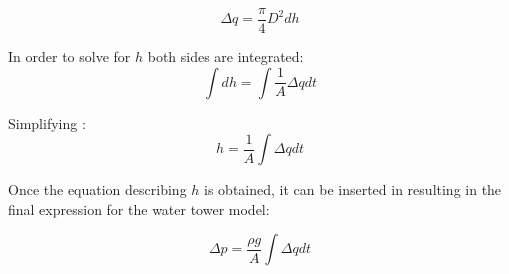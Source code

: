 \begin{equation}
  \Delta q =  \frac{\pi}{4} D^2 {dh}
\end{equation}

In order to solve for $h$ both sides are integrated: 
\begin{equation}
  \int dh = \int \frac{1}{A} \Delta q dt
  \label{integheight}
\end{equation}

Simplifying :
\begin{equation}
  h =\frac{1}{A}  \int  \Delta q dt
\end{equation}

Once the equation describing $h$ is obtained, it can be inserted in  
resulting in the final expression for the water tower model:

\begin{equation}
  \Delta p =  \frac{\rho g}{A}  \int  \Delta q dt
\end{equation}


